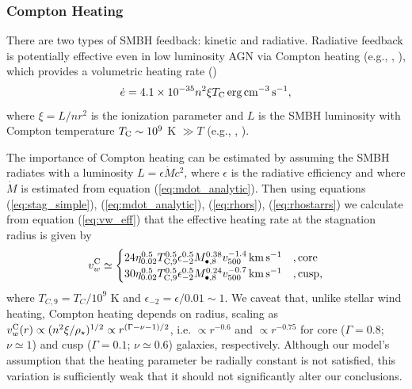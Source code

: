 \documentclass[usenatbib,fleqn]{mn2e}
\newcommand{\densSlope}{\nu}
\begin{document}
\subsubsection{Compton Heating}

There are two types of SMBH feedback: kinetic and radiative.
Radiative feedback is potentially effective even in low luminosity AGN
via Compton heating (e.g., \citealt{Sazonov+04}, \citealt{Ciotti+10}),
which provides a volumetric heating rate (\citealt{Gan+14})
\begin{align}
\dot{e} = 4.1\times 10^{-35}n^{2}\xi T_{\rm C}\,{\rm erg\,cm^{-3}\,s^{-1}},
\end{align}
where $\xi = L/n r^{2}$ is the ionization parameter and $L$ is the SMBH luminosity with Compton temperature $T_{\rm C} \sim 10^{9}$ K $\gg T$ (e.g., \citealt{Ho99}, \citealt{Eracleous+10}).  

The importance of Compton heating can be estimated by assuming the SMBH
radiates with a luminosity $L = \epsilon \dot{M}c^{2}$, where
$\epsilon$ is the radiative efficiency and where $\dot{M}$ is
estimated from equation (\ref{eq:mdot_analytic}).  Then using
equations (\ref{eq:stag_simple}), (\ref{eq:mdot_analytic}),
(\ref{eq:rhors}), (\ref{eq:rhostarrs}) we calculate from equation
(\ref{eq:vw_eff}) that the effective heating rate at the stagnation radius is given by
\begin{align} v_{w}^{\rm C} \simeq
  \begin{cases} 24 \eta_{0.02}^{0.5}T_{\rm
C,9}^{0.5}\epsilon_{-2}^{0.5} M_{\bullet,8}^{0.38}v_{500}^{-1.4}\,{\rm
km\,s^{-1}} &, \text{core}\\ 30 \eta_{0.02}^{0.5}T_{\rm
C,9}^{0.5}\epsilon_{-2}^{0.5} M_{\bullet,8}^{0.24}v_{500}^{-0.7}\,{\rm
km\,s^{-1}} &, \text{cusp},
  \end{cases}
  \label{eq:vC}
\end{align} where $T_{C,9} = T_{C}/10^{9}$ K and $\epsilon_{-2} =
\epsilon/0.01 \sim 1$.  We caveat that, unlike stellar wind heating,
Compton heating depends on radius, scaling as $v_{w}^{\rm C}(r)
\propto (n^{2}\xi/\rho_{\star})^{1/2} \propto
r^{(\Gamma-\densSlope-1)/2}$, i.e. $\propto r^{-0.6}$ and $\propto
r^{-0.75}$ for core ($\Gamma = 0.8$; $\densSlope \simeq 1$) and cusp
($\Gamma = 0.1$; $\densSlope \simeq 0.6$) galaxies, respectively.
Although our model's assumption that the heating parameter be radially
constant is not satisfied, this variation is sufficiently weak that it
should not significantly alter our conclusions.
\end{document}
